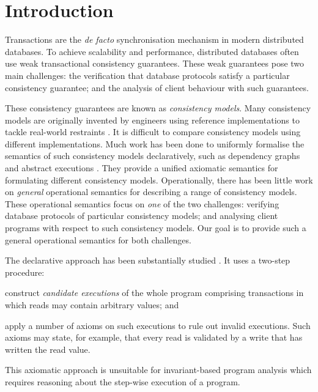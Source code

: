 \section{Introduction}
\label{sec:intro}

Transactions are the \emph{de facto} synchronisation mechanism in
modern distributed databases.  To achieve scalability and performance,
distributed databases often use weak transactional consistency
guarantees. These weak guarantees pose two main challenges: the
verification that database protocols satisfy a particular consistency
guarantee; and the analysis of client behaviour with such guarantees.

These consistency guarantees are known as \emph{consistency models}.
Many consistency models are originally invented by engineers
using reference implementations to tackle real-world restraints \cite{tango,CORFU,ramp,rola,cops,wren,redblue,PSI,NMSI,gdur,clocksi,distrsi,PSI-RA,si}.
It is difficult to compare consistency models using different implementations.
Much work has been done to uniformly formalise the semantics of such consistency models declaratively,
such as dependency graphs \cite{adya} and abstract executions \cite{ev_transactions}.
They provide a unified axiomatic semantics for formulating different consistency models.
Operationally, there has been little work on \emph{general} operational semantics
for describing a range of consistency models.
These operational semantics focus on \emph{one} of the two challenges:
verifying database protocols of particular consistency models;
and analysing client programs with respect to such consistency models.  
Our goal is to provide such a general operational semantics for both challenges.

The declarative approach has been substantially
studied \cite{adya,ev_transactions,framework-concur,laws}. 
It uses a two-step procedure:
\begin{enumerate*}
\item construct {\em candidate executions} of the whole program comprising
transactions in which reads may contain arbitrary values; and 
\item apply a number of axioms on such executions to rule out invalid executions. 
Such axioms may state, for example, that every read is
validated by a write that has written the read value. 
\end{enumerate*}
This axiomatic approach is unsuitable for invariant-based program analysis 
which requires reasoning about the step-wise execution of a program. 

